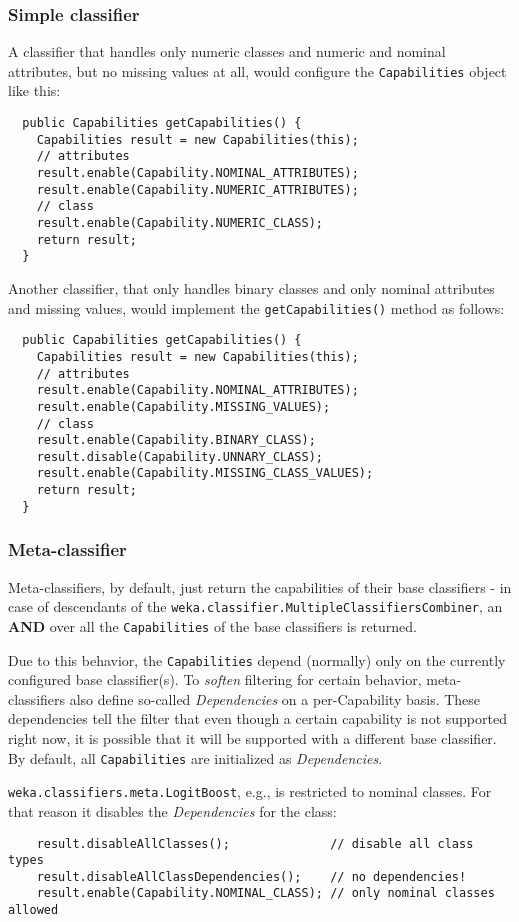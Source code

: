 \subsubsection*{Simple classifier}
A classifier that handles only numeric classes and numeric and nominal
attributes, but no missing values at all, would configure the
\texttt{Capabilities} object like this:
\begin{verbatim}
  public Capabilities getCapabilities() {
    Capabilities result = new Capabilities(this);
    // attributes
    result.enable(Capability.NOMINAL_ATTRIBUTES);
    result.enable(Capability.NUMERIC_ATTRIBUTES);
    // class
    result.enable(Capability.NUMERIC_CLASS);
    return result;
  }
\end{verbatim}
Another classifier, that only handles binary classes and only nominal
attributes and missing values, would implement the \texttt{getCapabilities()}
method as follows:
\begin{verbatim}
  public Capabilities getCapabilities() {
    Capabilities result = new Capabilities(this);
    // attributes
    result.enable(Capability.NOMINAL_ATTRIBUTES);
    result.enable(Capability.MISSING_VALUES);
    // class
    result.enable(Capability.BINARY_CLASS);
    result.disable(Capability.UNNARY_CLASS);
    result.enable(Capability.MISSING_CLASS_VALUES);
    return result;
  }
\end{verbatim}

\subsubsection*{Meta-classifier}
Meta-classifiers, by default, just return the capabilities of their base
classifiers - in case of descendants of the
\texttt{weka.classifier.MultipleClassifiersCombiner}, an \textbf{AND} over all
the \texttt{Capabilities} of the base classifiers is returned.

Due to this behavior, the \texttt{Capabilities} depend (normally) only on the
currently configured base classifier(s). To \textit{soften} filtering for
certain behavior, meta-classifiers also define so-called \textit{Dependencies}
on a per-Capability basis. These dependencies tell the filter that even though a
certain capability is not supported right now, it is possible that it will be
supported with a different base classifier. By default, all
\texttt{Capabilities} are initialized as \textit{Dependencies}.

\texttt{weka.classifiers.meta.LogitBoost}, e.g., is restricted to nominal
classes. For that reason it disables the \textit{Dependencies} for the class:
{\small \begin{verbatim}
    result.disableAllClasses();              // disable all class types
    result.disableAllClassDependencies();    // no dependencies!
    result.enable(Capability.NOMINAL_CLASS); // only nominal classes allowed
\end{verbatim}}

